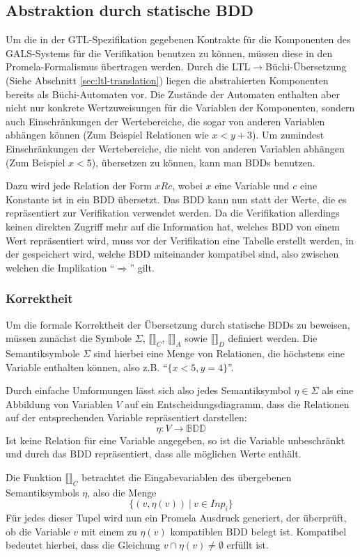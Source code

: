 \subsection{Abstraktion durch statische BDD}
Um die in der GTL-Spezifikation gegebenen Kontrakte für die Komponenten des GALS-Systems für die Verifikation benutzen zu können, müssen diese in den Promela-Formalismus übertragen werden.
Durch die LTL$\rightarrow$Büchi-Übersetzung (Siehe Abschnitt \ref{sec:ltl-translation}) liegen die abstrahierten Komponenten bereits als Büchi-Automaten vor.
Die Zustände der Automaten enthalten aber nicht nur konkrete Wertzuweisungen für die Variablen der Komponenten, sondern auch Einschränkungen der Wertebereiche, die sogar von anderen Variablen abhängen können (Zum Beispiel Relationen wie $x < y + 3$).
Um zumindest Einschränkungen der Wertebereiche, die nicht von anderen Variablen abhängen (Zum Beispiel $x < 5$), übersetzen zu können, kann man BDDs benutzen.

Dazu wird jede Relation der Form $x R c$, wobei $x$ eine Variable und $c$ eine Konstante ist in ein BDD übersetzt.
Das BDD kann nun statt der Werte, die es repräsentiert zur Verifikation verwendet werden.
Da die Verifikation allerdings keinen direkten Zugriff mehr auf die Information hat, welches BDD von einem Wert repräsentiert wird, muss vor der Verifikation eine Tabelle erstellt werden, in der gespeichert wird, welche BDD miteinander kompatibel sind, also zwischen welchen die Implikation "`$\Rightarrow$"' gilt.
\subsubsection{Korrektheit}
Um die formale Korrektheit der Übersetzung durch statische BDDs zu beweisen, müssen zunächst die Symbole $\Sigma$, $\llbracket\rrbracket_C$, $\llbracket\rrbracket_A$ sowie $\llbracket\rrbracket_D$ definiert werden.
Die Semantiksymbole $\Sigma$ sind hierbei eine Menge von Relationen, die höchstens eine Variable enthalten können, also z.B. "`$\{x<5,y=4\}$"'.

Durch einfache Umformungen lässt sich also jedes Semantiksymbol $\eta\in\Sigma$ als eine Abbildung von Variablen $V$ auf ein Entscheidungsdiagramm, dass die Relationen auf der entsprechenden Variable repräsentiert darstellen:
\[ \eta : V\rightarrow \mathbb{BDD} \]
Ist keine Relation für eine Variable angegeben, so ist die Variable unbeschränkt und durch das BDD repräsentiert, dass alle möglichen Werte enthält.

Die Funktion $\llbracket\rrbracket_C$ betrachtet die Eingabevariablen des übergebenen Semantiksymbols $\eta$, also die Menge
\[ \{ (v,\eta(v))\ |\ v\in \mathit{Inp}_i \} \]
Für jedes dieser Tupel wird nun ein Promela Ausdruck generiert, der überprüft, ob die Variable $v$ mit einem zu $\eta(v)$ kompatiblen BDD belegt ist.
Kompatibel bedeutet hierbei, dass die Gleichung $v\cap\eta(v)\neq \emptyset$ erfüllt ist.

